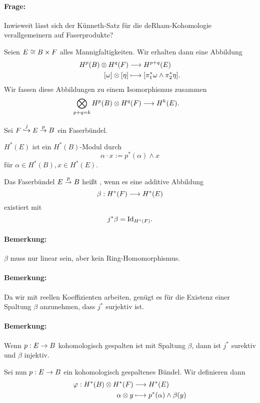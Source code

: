 \paragraph{Frage:} Inwieweit lässt sich der Künneth-Satz für die deRham-Kohomologie verallgemeinern auf Faserprodukte?


Seien $E \overset{}{\cong} B \times F$ alles Mannigfaltigkeiten. Wir erhalten dann eine Abbildung
\begin{align*}
H^p(B) \otimes H^q(F) &\overset{}{\longrightarrow} H^{p+q}(E)\\
[\omega] \otimes [\eta] & \longmapsto [\pi_1^*\omega \wedge \pi_2^*\eta].
\end{align*}
Wir fassen diese Abbildungen zu einem Isomorphismus zusammen
\begin{align*}
\bigotimes_{p+q = k}H^p(B) \otimes H^q(F) &\overset{}{\longrightarrow} H^{k}(E).
\end{align*}

Sei $F \overset{j}{\hookrightarrow} E \overset{p}{\rightarrow} B$ ein Faserbündel.
\begin{center}
\end{center}
$H^*(E)$ ist ein $H^*(B)$-Modul durch
\[ \alpha \cdot x := p^*(\alpha) \wedge x \]
für $\alpha \in H^*(B), x \in H^*(E)$.

\Def{}
Das Faserbündel $E \overset{p}{\rightarrow} B$ heißt , wenn es eine additive Abbildung
\[ \beta : H^*(F) \overset{}{\longrightarrow} H^*(E) \]
existiert mit
\[ j^* \beta = \text{Id}_{H^*(F)}. \]
\paragraph{Bemerkung:} $\beta$ muss nur linear sein, aber kein Ring-Homomorphismus.
\paragraph{Bemerkung:} Da wir mit reellen Koeffizienten arbeiten, genügt es für die Existenz einer Spaltung $\beta$ anzunehmen, dass $j^*$ surjektiv ist.
\paragraph{Bemerkung:} Wenn $p: E \overset{}{\rightarrow} B$ kohomologisch gespalten ist mit Spaltung $\beta$, dann ist $j^*$ surektiv und $\beta$ injektiv.

\Def{}
Sei nun $p : E \overset{}{\rightarrow} B$ ein kohomologisch gespaltenes Bündel. Wir definieren dann
\begin{align*}
\varphi : H^*(B) \otimes H^*(F) &\overset{}{\longrightarrow} H^*(E)\\
\alpha \otimes y & \longmapsto p^*(\alpha) \wedge \beta(y)
\end{align*}
